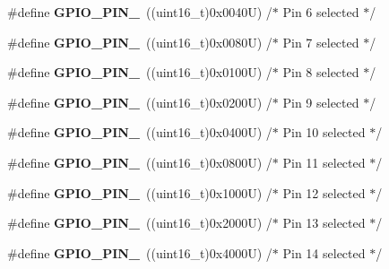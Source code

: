 \begin{DoxyCompactItemize}
\#define {\bfseries G\+P\+I\+O\+\_\+\+P\+I\+N\+\_}~((uint16\+\_\+t)0x0040\+U)  /$\ast$ Pin 6 selected    $\ast$/
\item 
\mbox{\label{group___g_p_i_o__pins__define_ga482cb86c2f036e630661a41e8986bcfe}} 
\#define {\bfseries G\+P\+I\+O\+\_\+\+P\+I\+N\+\_}~((uint16\+\_\+t)0x0080\+U)  /$\ast$ Pin 7 selected    $\ast$/
\item 
\mbox{\label{group___g_p_i_o__pins__define_gaf5eb6a42a4428e236bd4fd08ade71e7a}} 
\#define {\bfseries G\+P\+I\+O\+\_\+\+P\+I\+N\+\_}~((uint16\+\_\+t)0x0100\+U)  /$\ast$ Pin 8 selected    $\ast$/
\item 
\mbox{\label{group___g_p_i_o__pins__define_ga4c503cb4a0dc0d18261080051d9c2daf}} 
\#define {\bfseries G\+P\+I\+O\+\_\+\+P\+I\+N\+\_}~((uint16\+\_\+t)0x0200\+U)  /$\ast$ Pin 9 selected    $\ast$/
\item 
\mbox{\label{group___g_p_i_o__pins__define_gac102c0123cb8bcadc5b590cd940b9e20}} 
\#define {\bfseries G\+P\+I\+O\+\_\+\+P\+I\+N\+\_}~((uint16\+\_\+t)0x0400\+U)  /$\ast$ Pin 10 selected   $\ast$/
\item 
\mbox{\label{group___g_p_i_o__pins__define_ga79f6797ea82c1fb25cd6c0e14e44d312}} 
\#define {\bfseries G\+P\+I\+O\+\_\+\+P\+I\+N\+\_}~((uint16\+\_\+t)0x0800\+U)  /$\ast$ Pin 11 selected   $\ast$/
\item 
\mbox{\label{group___g_p_i_o__pins__define_ga95f9ce5911fa8b209defb969db93ced3}} 
\#define {\bfseries G\+P\+I\+O\+\_\+\+P\+I\+N\+\_}~((uint16\+\_\+t)0x1000\+U)  /$\ast$ Pin 12 selected   $\ast$/
\item 
\mbox{\label{group___g_p_i_o__pins__define_ga173023dced8f9692ade0f1176558ef70}} 
\#define {\bfseries G\+P\+I\+O\+\_\+\+P\+I\+N\+\_}~((uint16\+\_\+t)0x2000\+U)  /$\ast$ Pin 13 selected   $\ast$/
\item 
\mbox{\label{group___g_p_i_o__pins__define_ga315b4dc1a0c1f9021b3d3a8fe9ccc0c3}} 
\#define {\bfseries G\+P\+I\+O\+\_\+\+P\+I\+N\+\_}~((uint16\+\_\+t)0x4000\+U)  /$\ast$ Pin 14 selected   $\ast$/

\end{DoxyCompactItemize}
